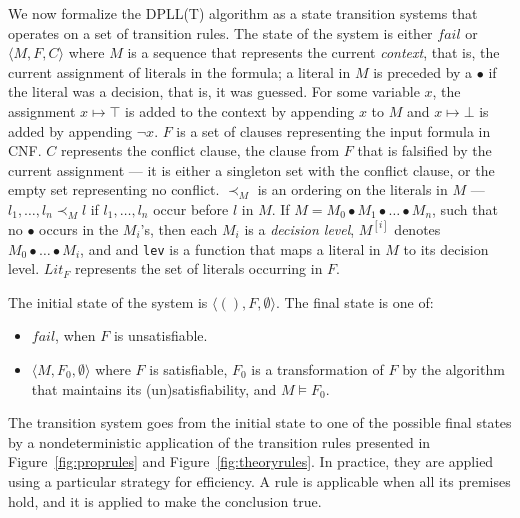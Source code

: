 \documentclass[11pt]{article}
\begin{document}
	We now formalize the DPLL(T) algorithm 
	as a state transition systems that 
	operates on a set of transition rules. 
	The state of the system is either 
	$fail$ or $\langle M, F, C \rangle$ 
	where $M$ is a sequence that 
	represents the current 
	\textit{context}, that is, 
	the current assignment of literals in 
	the formula; a literal in $M$ is 
	preceded by a $\bullet$ if the literal 
	was a decision, that is, it was 
	guessed. For some variable $x$, 
	the assignment $x \mapsto \top$ is added 
	to the context by appending $x$ to 
	$M$ and $x \mapsto \bot$ is added by 
	appending $\neg x$. $F$ is a set of 
	clauses representing the input formula 
	in CNF. $C$ represents the conflict 
	clause, the clause from $F$ that is 
	falsified by the current assignment ---
	it is either a singleton set with 
	the conflict clause, or the empty 
	set representing no conflict. 
	$\prec_M$ is an ordering 
	on the literals in $M$ ---
	$l_1, \ldots, l_n \prec_M l$ if 
	$l_1, \ldots, l_n$ occur before 
	$l$ in $M$. If $M = M_0 
	\bullet M_1 \bullet \ldots \bullet M_n$, 
	such that no $\bullet$ occurs in 
	the $M_i$'s, then each $M_i$ is a
	\textit{decision level}, $M^{[i]}$ 
	denotes $M_0 \bullet \ldots \bullet M_i$,
	and and \texttt{lev} is a function 
	that maps a literal in $M$ to its 
	decision level. $Lit_F$ represents the 
	set of literals occurring in $F$.
	
	The initial state of the system is 
	$\langle (), F, \emptyset \rangle$. 
	The final state is one of:
	\begin{itemize}
		\item $fail$, when $F$ is 
		unsatisfiable.
		\item $\langle M, F_0, \emptyset \rangle$ 
		where $F$ is satisfiable, $F_0$ is 
		a transformation of $F$ by the 
		algorithm that maintains its 
		(un)satisfiability,	and $M 
		\models F_0$.
	\end{itemize}
	
	The transition system goes from the 
	initial state to one of the possible 
	final states by a nondeterministic 
	application of the transition rules 
	presented in Figure~\ref{fig:proprules} 
	and Figure~\ref{fig:theoryrules}. In 
	practice, they are applied using a 
	particular strategy for efficiency.
	A rule is applicable when all its 
	premises hold, and it is applied to 
	make the conclusion true. 
\end{document}
